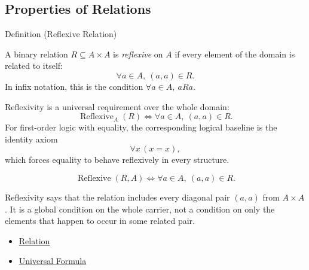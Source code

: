 
\subsection{Properties of Relations}


\begin{definitionbox}{Definition (Reflexive Relation)}
\begin{definition}\label{def:reflexive}
A binary relation $R\subseteq A\times A$ is \emph{reflexive} on $A$ if every
element of the domain is related to itself:
\[
  \forall a\in A,\ (a,a)\in R.
\]
In infix notation, this is the condition $\forall a\in A,\ aRa$.
\end{definition}
\end{definitionbox}


\begin{remark*}
Reflexivity is a universal requirement over the whole domain:
\[
  \operatorname{Reflexive}_A(R)
  \iff
  \forall a\in A,\ (a,a)\in R.
\]
For first-order logic with equality, the corresponding logical baseline is
the identity axiom
\[
  \forall x\,(x=x),
\]
which forces equality to behave reflexively in every structure.
\end{remark*}

\begin{remark*}
\[
  \operatorname{Reflexive}(R,A)
  \iff
  \forall a\in A,\ (a,a)\in R.
\]
\end{remark*}

\begin{remark*}[Interpretation]
Reflexivity says that the relation includes every diagonal pair $(a,a)$ from
$A\times A$. It is a global condition on the whole carrier, not a condition on
only the elements that happen to occur in some related pair.
\end{remark*}

\begin{dependencies}
\begin{itemize}
  \item \hyperref[def:relation]{Relation}
  \item \hyperref[def:universal-q]{Universal Formula}
\end{itemize}
\end{dependencies}


